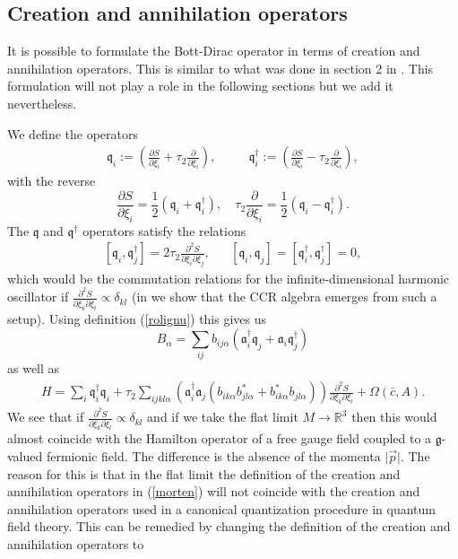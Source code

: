 \documentclass[12pt]{article}
\def\a{\alpha}
\def\d{\delta}
\def\OO{\Omega}
\newcommand{\pa}{\partial}
\begin{document}
\subsection{Creation and annihilation operators}


It is possible to formulate the Bott-Dirac operator in terms of creation and annihilation operators. This is similar to what was done in section 2 in \cite{Aastrup:2017atr}. This formulation will not play a role in the following sections but we add it nevertheless. 

We define the operators 
\begin{eqnarray}
\mathfrak{q}_i := \left( \frac{\pa S}{\pa \xi_i}+ \tau_2  \frac{\pa}{\pa\xi_i}\right)  , &&\quad
\mathfrak{q}_i^\dagger :=  \left( \frac{\pa S}{\pa \xi_i} -\tau_2 \frac{\pa}{\pa\xi_i} \right) ,
\label{morten}
\end{eqnarray}
with the reverse
$$
 \frac{\pa S}{\pa \xi_i} =  \frac{1}{2}  (\mathfrak{q}_i +\mathfrak{q}_i^\dagger ) ,   \quad    \tau_2 \frac{\pa}{\pa\xi_i} =\frac{1}{2}  (\mathfrak{q}_i -\mathfrak{q}_i^\dagger ).
$$
The $\mathfrak{q}$ and $\mathfrak{q}^\dagger$ operators satisfy the relations  
\begin{eqnarray}
\left[\mathfrak{q}_i , \mathfrak{q}_j^\dagger \right] =  {2\tau_2} \frac{\pa^2 S}{\pa\xi_i \pa \xi_j} ,
&&
\left[\mathfrak{q}_i  , \mathfrak{q}_j\right] =  \left[\mathfrak{q}_i^\dagger  , \mathfrak{q}_j^\dagger\right] =   0,
\label{covi}
\end{eqnarray}
which would be the commutation relations for the infinite-dimensional harmonic oscillator if $ \frac{\pa^2 S}{\pa\xi_k \pa \xi_l}\propto \d_{kl}$ (in \cite{Aastrup:2017atr} we show that the CCR algebra emerges from such a setup). 
Using definition (\ref{rolignu}) this gives us
$$
B_\a =  \sum_{ij} b_{ij\a} \left(  \mathfrak{a}_i^\dagger  \mathfrak{q}_j +   \mathfrak{a}_i \mathfrak{q}_j^\dagger   \right)
$$
as well as 
\begin{eqnarray}
H= 
 \sum_{i} \mathfrak{q}_i^\dagger   \mathfrak{q}_i 
 +{\tau_2}\sum_{ijkl\a}  \left( \mathfrak{a}_i^\dagger  \mathfrak{a}_j  \left( b_{ik\a}b^*_{jl\a}  +b^*_{ik\a}b_{jl\a}   \right)    \right) \frac{\pa^2 S}{\pa\xi_k \pa \xi_l} +  \OO(\bar{c}, A)  .
\label{tja}
\end{eqnarray}
We see that if $\frac{\pa^2 S}{\pa\xi_k \pa \xi_l}  \propto \d_{kl}$ and if we take the flat limit $M\rightarrow \mathbb{R}^3$ then this would almost coincide with the Hamilton operator of a free gauge field coupled to a $\mathfrak{g}$-valued fermionic field. The difference is the absence of the momenta $\vert \vec{p} \vert$. The reason for this is that in the flat limit the definition of the creation and annihilation operators in (\ref{morten}) will not coincide with the creation and annihilation operators used in a canonical quantization procedure in quantum field theory. This can be remedied by changing the definition of the creation and annihilation operators to
\end{document}
